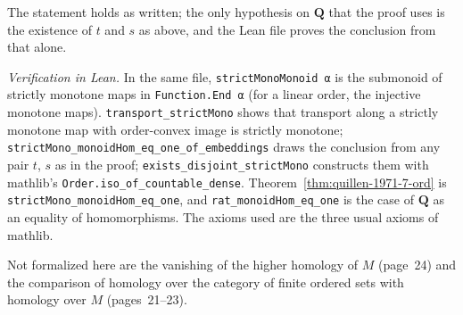 \noindent The statement holds as written; the only hypothesis on $\mathbf Q$ that the proof uses is the existence of $t$ and $s$ as above, and the Lean file proves the conclusion from that alone.

\emph{Verification in Lean.} In the same file, \texttt{strictMonoMonoid α} is the submonoid of strictly monotone maps in \texttt{Function.End α} (for a linear order, the injective monotone maps). \texttt{transport\_strictMono} shows that transport along a strictly monotone map with order-convex image is strictly monotone; \texttt{strictMono\_monoidHom\_eq\_one\_of\_embeddings} draws the conclusion from any pair $t$, $s$ as in the proof; \texttt{exists\_disjoint\_strictMono} constructs them with mathlib's \texttt{Order.iso\_of\_countable\_dense}. Theorem~\ref{thm:quillen-1971-7-ord} is \texttt{strictMono\_monoidHom\_eq\_one}, and \texttt{rat\_monoidHom\_eq\_one} is the case of $\mathbf Q$ as an equality of homomorphisms. The axioms used are the three usual axioms of mathlib.

Not formalized here are the vanishing of the higher homology of $M$ (page~24) and the comparison of homology over the category of finite ordered sets with homology over $M$ (pages~21--23).

